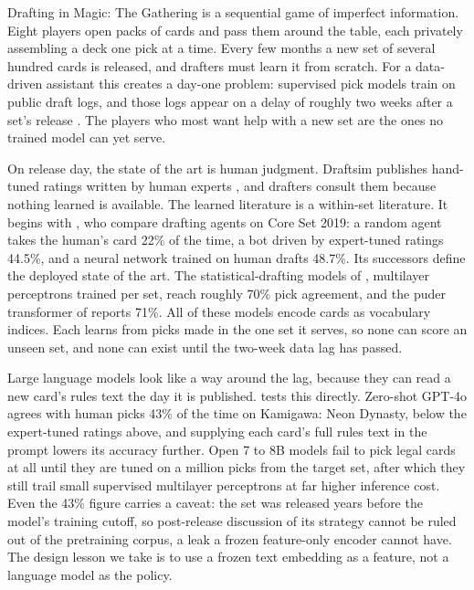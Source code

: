 \documentclass[11pt]{article}
\numberwithin{equation}{section}
\begin{document}
Drafting in Magic: The Gathering is a sequential game of imperfect information.
Eight players open packs of cards and pass them around the table, each privately
assembling a deck one pick at a time. Every few months a new set of several
hundred cards is released, and drafters must learn it from scratch. For a
data-driven assistant this creates a day-one problem: supervised pick models
train on public draft logs, and those logs appear on a delay of roughly two weeks
after a set's release \citep{brooks2024statistical}. The players who most want
help with a new set are the ones no trained model can yet serve.

On release day, the state of the art is human judgment. Draftsim publishes
hand-tuned ratings written by human experts \citep{draftsimratings}, and drafters
consult them because nothing learned is available. The learned literature is a
within-set literature. It begins with \citet{ward2021}, who compare drafting
agents on Core Set 2019: a random agent takes the human's card 22\% of the time,
a bot driven by expert-tuned ratings 44.5\%, and a neural network trained on
human drafts 48.7\%. Its successors define the deployed state of the art. The
statistical-drafting models of \citet{brooks2024statistical}, multilayer
perceptrons trained per set, reach roughly 70\% pick agreement, and the puder
transformer of \citet{czerner2025puder} reports 71\%. All of these models encode
cards as vocabulary indices. Each learns from picks made in the one set it
serves, so none can score an unseen set, and none can exist until the two-week
data lag has passed.

Large language models look like a way around the lag, because they can read a new
card's rules text the day it is published. \citet{bertram2025} tests this
directly. Zero-shot GPT-4o agrees with human picks 43\% of the time on Kamigawa:
Neon Dynasty, below the expert-tuned ratings above, and supplying each card's
full rules text in the prompt lowers its accuracy further. Open 7 to 8B models fail
to pick legal cards at all until they are tuned on a million picks from the
target set, after which they still trail small supervised multilayer perceptrons
at far higher inference cost. Even the 43\% figure carries a caveat: the set was
released years before the model's training cutoff, so post-release discussion of
its strategy cannot be ruled out of the pretraining corpus, a leak a frozen
feature-only encoder cannot have. The design lesson we take is to use a frozen
text embedding as a feature, not a language model as the policy.
\end{document}
